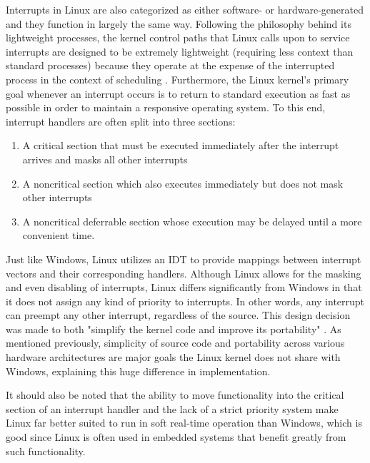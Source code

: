 \documentclass[onecolumn, draftclsnofoot,10pt, compsoc]{IEEEtran}
\begin{document}
Interrupts in Linux are also categorized as either software- or hardware-generated and they function in largely the same way. Following the philosophy behind its lightweight processes, the kernel control paths that Linux calls upon to service interrupts are designed to be extremely lightweight (requiring less context than standard processes) because they operate at the expense of the interrupted process in the context of scheduling \cite{LinuxKernel}. Furthermore, the Linux kernel's primary goal whenever an interrupt occurs is to return to standard execution as fast as possible in order to maintain a responsive operating system. To this end, interrupt handlers are often split into three sections: 
\begin{enumerate}
\item A critical section that must be executed immediately after the interrupt arrives and masks all other interrupts
\item A noncritical section which also executes immediately but does not mask other interrupts
\item A noncritical deferrable section whose execution may be delayed until a more convenient time.
\end{enumerate}
Just like Windows, Linux utilizes an IDT to provide mappings between interrupt vectors and their corresponding handlers. Although Linux allows for the masking and even disabling of interrupts, Linux differs significantly from Windows in that it does not assign any kind of priority to interrupts. In other words, any interrupt can preempt any other interrupt, regardless of the source. This design decision was made to both "simplify the kernel code and improve its portability" \cite{LinuxKernel}. As mentioned previously, simplicity of source code and portability across various hardware architectures are major goals the Linux kernel does not share with Windows, explaining this huge difference in implementation.

It should also be noted that the ability to move functionality into the critical section of an interrupt handler and the lack of a strict priority system make Linux far better suited to run in soft real-time operation than Windows, which is good since Linux is often used in embedded systems that benefit greatly from such functionality.
\end{document}
